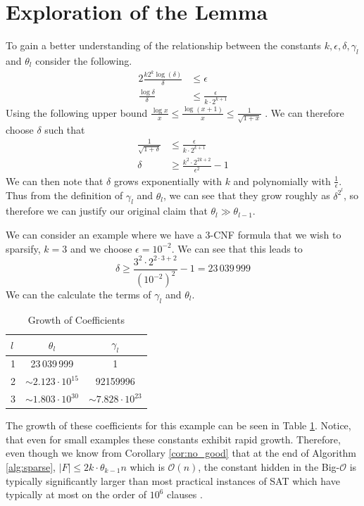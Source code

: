 \section{Exploration of the Lemma}
To gain a better understanding of the relationship between the constants $k, \epsilon, \delta, \gamma_l$ and $\theta_l$
consider the following.
\begin{align*}
    2 \frac{k2^{k}\log(\delta)}{\delta} &\leq \epsilon \\
    \frac{\log \delta}{\delta} &\leq \frac{\epsilon}{k \cdot 2^{k+1}}
\end{align*}
Using the following upper bound $\frac{\log x}{x} \leq \frac{\log(x + 1)}{x} \leq \frac{1}{\sqrt{1 + x}}$ \cite{topsok2006some}.
We can therefore choose $\delta$ such that
\begin{align*}
    \frac{1}{\sqrt{1 + \delta}} &\leq \frac{\epsilon}{k \cdot 2^{k+1}} \\
    \delta &\geq \frac{k^2 \cdot 2^{2k+2}}{\epsilon^2} - 1
\end{align*}
We can then note that $\delta$ grows exponentially with $k$ and polynomially with $\frac{1}{\epsilon}$.
Thus from the definition of $\gamma_l$ and $\theta_l$, we can see that they grow roughly as $\delta^{2^{l}}$,
so therefore we can justify our original claim that $\theta_l \gg \theta_{l-1}$.
\begin{example}
    We can consider an example where we have a 3-CNF formula that we wish to sparsify, $k = 3$ and we choose
    $\epsilon = 10^{-2}$. We can see that this leads to
    \begin{equation*}
        \delta \geq \frac{3^2 \cdot 2^{2 \cdot 3 + 2}}{{(10^{-2})}^{2}} - 1 = 23\,039\,999
    \end{equation*}
    We can the calculate the terms of $\gamma_l$ and $\theta_l$.
    \begin{table}
        \centering
        \begin{tabular}{l c c}
        \toprule
             $l$ & $\theta_l$ & $\gamma_l$ \\
             \midrule
             1 & 23\,039\,999 & 1  \\
             2 & $\sim 2.123 \cdot 10^{15}$ & 92159996 \\
             3 & $\sim 1.803 \cdot 10^{30}$ & $\sim 7.828 \cdot 10^{23}$ \\
        \bottomrule
        \end{tabular}
        \caption{Growth of Coefficients}
        \label{tab:coeffs_example}
    \end{table}
    The growth of these coefficients for this example can be seen in Table \ref{tab:coeffs_example}.
    Notice, that even for small examples these constants exhibit rapid growth. Therefore, even
    though we know from Corollary \ref{cor:no_good} that at the end of Algorithm \ref{alg:sparse},
    $|F| \leq 2k \cdot \theta_{k-1} n$ which is $\mathcal{O}(n)$, the constant hidden in the Big-$\mathcal{O}$
    is typically significantly larger than most practical instances of SAT which have typically at most on the
    order of $10^6$ clauses \cite{SAT_Comp2017}.
\end{example}

